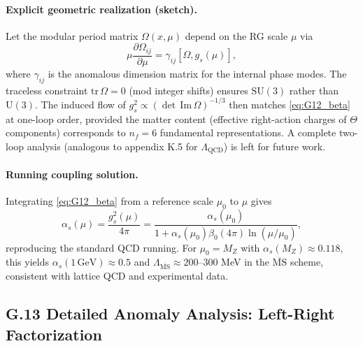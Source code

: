 \paragraph{Explicit geometric realization (sketch).}
Let the modular period matrix $\Omega(x,\mu)$ depend on the RG scale $\mu$ via
\begin{equation}
\mu\frac{\partial \Omega_{ij}}{\partial \mu} = \gamma_{ij}[\Omega,g_s(\mu)],
\end{equation}
where $\gamma_{ij}$ is the anomalous dimension matrix for the internal phase modes. The traceless constraint $\mathrm{tr}\,\Omega=0$ (mod integer shifts) ensures $\mathrm{SU}(3)$ rather than $\mathrm{U}(3)$. The induced flow of $g_s^2 \propto (\det\,\mathrm{Im}\,\Omega)^{-1/3}$ then matches \eqref{eq:G12_beta} at one-loop order, provided the matter content (effective right-action charges of $\Theta$ components) corresponds to $n_f=6$ fundamental representations. A complete two-loop analysis (analogous to appendix K.5 for $\Lambda_{\mathrm{QCD}}$) is left for future work.

\paragraph{Running coupling solution.}
Integrating \eqref{eq:G12_beta} from a reference scale $\mu_0$ to $\mu$ gives
\begin{equation}
\alpha_s(\mu) = \frac{g_s^2(\mu)}{4\pi} = \frac{\alpha_s(\mu_0)}{1 + \alpha_s(\mu_0)\beta_0(4\pi)\ln(\mu/\mu_0)},
\end{equation}
reproducing the standard QCD running. For $\mu_0=M_Z$ with $\alpha_s(M_Z)\approx 0.118$, this yields $\alpha_s(1\,\mathrm{GeV})\approx 0.5$ and $\Lambda_{\overline{\mathrm{MS}}}\approx 200$–$300$ MeV in the $\overline{\mathrm{MS}}$ scheme, consistent with lattice QCD and experimental data.

\subsection*{G.13 Detailed Anomaly Analysis: Left-Right Factorization}
\label{sec:G13_anomalies}

